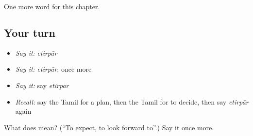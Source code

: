 \begin{grammarlens}[title={What you've built}]
One more word for this chapter.
\end{grammarlens}

\subsection*{Your turn}
\begin{itemize}
\raggedright
  \item \emph{Say it:} \emph{etirpār}
  \item \emph{Say it:} \emph{etirpār}, once more
  \item \emph{Say it:} say \emph{etirpār}
  \item \emph{Recall:} say the Tamil for a plan, then the Tamil for to decide, then say \emph{etirpār} again
\end{itemize}

\begin{tcolorbox}[breakable,colback=teal!4,colframe=teal!35!black,title={Before you move on}]
What does  mean? (\textquotedblleft{}To expect, to look forward to\textquotedblright{}.) Say it once more.
\end{tcolorbox}
